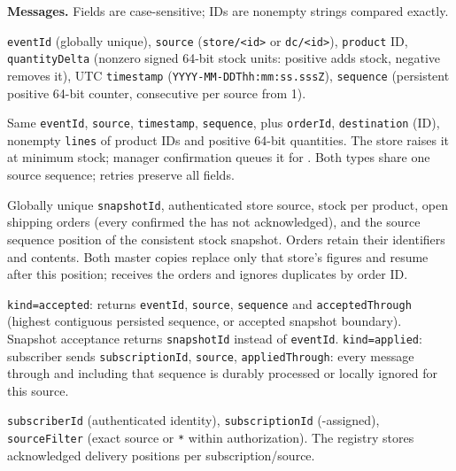 \textbf{Messages.} Fields are case-sensitive; IDs are nonempty strings compared exactly.
\begin{description}[nosep,leftmargin=1em,style=nextline]
\item[\InventoryEvent]
\texttt{eventId} (globally unique), \texttt{source} (\texttt{store/<id>} or
\texttt{dc/<id>}), \texttt{product} ID, \texttt{quantityDelta} (nonzero signed
64-bit stock units: positive adds stock, negative removes it), UTC \texttt{timestamp}
(\texttt{YYYY-MM-DDThh:mm:ss.sssZ}),
\texttt{sequence} (persistent positive 64-bit counter, consecutive per source from 1).
\item[\ShippingOrder]
Same \texttt{eventId}, \texttt{source}, \texttt{timestamp}, \texttt{sequence}, plus \texttt{orderId}, \texttt{destination}
(\DC ID), nonempty \texttt{lines} of product IDs and positive 64-bit quantities.
The store raises it at minimum stock; manager confirmation queues it for
\ShippingOrderFulfillment. Both types share one source sequence; retries preserve all fields.
\item[\StoreSnapshot]
Globally unique \texttt{snapshotId}, authenticated store source, stock per product,
open shipping orders (every confirmed
\ShippingOrder the \DC has not acknowledged), and the source sequence position of
the consistent stock snapshot. Orders retain their identifiers and contents.
Both master copies replace only that store's figures and resume after this position;
\ShippingOrderFulfillment receives the orders and ignores duplicates by order ID.
\item[\Acknowledgement]
\texttt{kind=accepted}: \CFE returns \texttt{eventId}, \texttt{source}, \texttt{sequence} and
\texttt{acceptedThrough} (highest contiguous persisted sequence, or accepted snapshot boundary).
Snapshot acceptance returns \texttt{snapshotId} instead of \texttt{eventId}.
\texttt{kind=applied}: subscriber sends \texttt{subscriptionId}, \texttt{source},
\texttt{appliedThrough}: every message through and including that sequence is
durably processed or locally ignored for this source.
\item[Subscription]
\texttt{subscriberId} (authenticated identity), \texttt{subscriptionId} (\CFE-assigned),
\texttt{sourceFilter} (exact source or \texttt{*} within authorization).
The registry stores acknowledged delivery positions per subscription/source.
\end{description}

